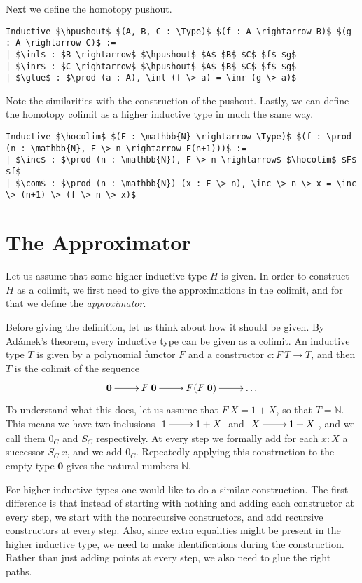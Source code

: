 \documentclass[a4paper,UKenglish]{lipics-v2016}
\newcommand{\zero}[0]{\textbf{0}}
\newcommand{\hpushout}[0]{\operatorname{\textbf{hpushout}}}
\newcommand{\hocolim}[0]{\operatorname{\textbf{hocolim}}}
\newcommand{\inl}[0]{\operatorname{\textbf{inl}}}
\newcommand{\inr}[0]{\operatorname{\textbf{inr}}}
\newcommand{\glue}[0]{\operatorname{\textbf{glue}}}
\newcommand{\inc}[0]{\operatorname{\textbf{inc}}}
\newcommand{\com}[0]{\operatorname{\textbf{com}}}
\newcommand{\Type}[0]{\operatorname{\textsc{Type}}}
\begin{document}
Next we define the homotopy pushout.
\lstset{language=Coq}
\begin{lstlisting}
Inductive $\hpushout$ $(A, B, C : \Type)$ $(f : A \rightarrow B)$ $(g : A \rightarrow C)$ :=
| $\inl$ : $B \rightarrow$ $\hpushout$ $A$ $B$ $C$ $f$ $g$
| $\inr$ : $C \rightarrow$ $\hpushout$ $A$ $B$ $C$ $f$ $g$
| $\glue$ : $\prod (a : A), \inl (f \> a) = \inr (g \> a)$
\end{lstlisting}
Note the similarities with the construction of the pushout.
Lastly, we can define the homotopy colimit as a higher inductive type in much the same way.
\lstset{language=Coq}
\begin{lstlisting}
Inductive $\hocolim$ $(F : \mathbb{N} \rightarrow \Type)$ $(f : \prod (n : \mathbb{N}, F \> n \rightarrow F(n+1)))$ :=
| $\inc$ : $\prod (n : \mathbb{N}), F \> n \rightarrow$ $\hocolim$ $F$ $f$
| $\com$ : $\prod (n : \mathbb{N}) (x : F \> n), \inc \> n \> x = \inc \> (n+1) \> (f \> n \> x)$
\end{lstlisting}

\section{The Approximator}
\label{sec:approximator}
Let us assume that some higher inductive type $H$ is given.
In order to construct $H$ as a colimit, we first need to give the approximations in the colimit, and for that we define the \emph{approximator}.

Before giving the definition, let us think about how it should be given.
By Ad\'amek's theorem, every inductive type can be given as a colimit.
An inductive type $T$ is given by a polynomial functor $F$ and a constructor $c : F \> T \rightarrow T$, and then $T$ is the colimit of the sequence
\[
\xymatrix
{
	\zero \ar[r] & F \> \zero  \ar[r] & F(F \> \zero) \ar[r] & \ldots
}
\]
To understand what this does, let us assume that $F \> X = 1 + X$, so that $T = \mathbb{N}$.
This means we have two inclusions  $\xymatrix{1 \ar[r] & 1+X}$ and  $\xymatrix{X \ar[r] & 1+X}$, and we call them $0_C$ and $S_C$ respectively.
At every step we formally add for each $x : X$ a successor $S_C \> x$, and we add $0_C$.
Repeatedly applying this construction to the empty type $\zero$ gives the natural numbers $\mathbb{N}$.

For higher inductive types one would like to do a similar construction.
The first difference is that instead of starting with nothing and adding each constructor at every step, we start with the nonrecursive constructors, and add recursive constructors at every step.
Also, since extra equalities might be present in the higher inductive type, we need to make identifications during the construction.
Rather than just adding points at every step, we also need to glue the right paths.
\end{document}
